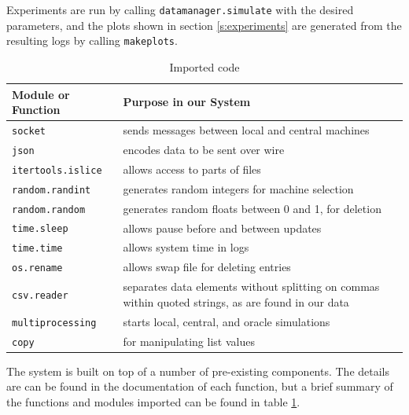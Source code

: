 Experiments are run by calling \texttt{datamanager.simulate} with the desired parameters, and the plots shown in section \ref{s:experiments} are generated from the resulting logs by calling \texttt{makeplots}.

\vspace{3em}
\begin{table}
\begin{tabular}{l|l}
Module or Function & Purpose in our System \\
\hline
    \texttt{socket} & sends messages between local and central machines \\
    \texttt{json} & encodes data to be sent over wire \\
    \texttt{itertools.islice} & allows access to parts of files\\
    \texttt{random.randint} & generates random integers for machine selection\\
    \texttt{random.random} & generates random floats between 0 and 1, for deletion\\
    \texttt{time.sleep} & allows pause before and between updates\\
    \texttt{time.time} & allows system time in logs\\
    \texttt{os.rename} & allows swap file for deleting entries\\
    \texttt{csv.reader} & separates data elements without splitting on commas within quoted strings, as are found in our data\\
    \texttt{multiprocessing} & starts local, central, and oracle simulations\\
    \texttt{copy} & for manipulating list values
\end{tabular}
\caption{Imported code}
\label{tab:modules}
\end{table}
\vspace{3em}

The system is built on top of a number of pre-existing components. The details are can be found in the documentation of each function, but a brief summary of the functions and modules imported can be found in table \ref{tab:modules}. 
